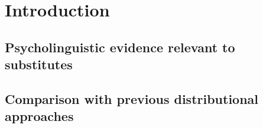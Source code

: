 \section{Introduction}
\label{sec:introduction}
\subsection{Psycholinguistic evidence relevant to substitutes}
\subsection{Comparison with previous distributional approaches}
